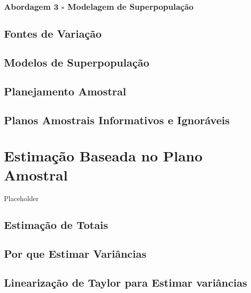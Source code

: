 \documentclass[
]{book}
\begin{document}
\hypertarget{modelsuperpop}{%
\subsection{Abordagem 3 - Modelagem de Superpopulação}\label{modelsuperpop}}

\hypertarget{fontes-de-variauxe7uxe3o}{%
\section{Fontes de Variação}\label{fontes-de-variauxe7uxe3o}}

\hypertarget{modelos-de-superpopulauxe7uxe3o}{%
\section{Modelos de Superpopulação}\label{modelos-de-superpopulauxe7uxe3o}}

\hypertarget{planamo}{%
\section{Planejamento Amostral}\label{planamo}}

\hypertarget{inform}{%
\section{Planos Amostrais Informativos e Ignoráveis}\label{inform}}

\hypertarget{capplanamo}{%
\chapter{Estimação Baseada no Plano Amostral}\label{capplanamo}}

Placeholder

\hypertarget{estimatotais}{%
\section{Estimação de Totais}\label{estimatotais}}

\hypertarget{por-que-estimar-variuxe2ncias}{%
\section{Por que Estimar Variâncias}\label{por-que-estimar-variuxe2ncias}}

\hypertarget{taylor}{%
\section{Linearização de Taylor para Estimar variâncias}\label{taylor}}
\end{document}
